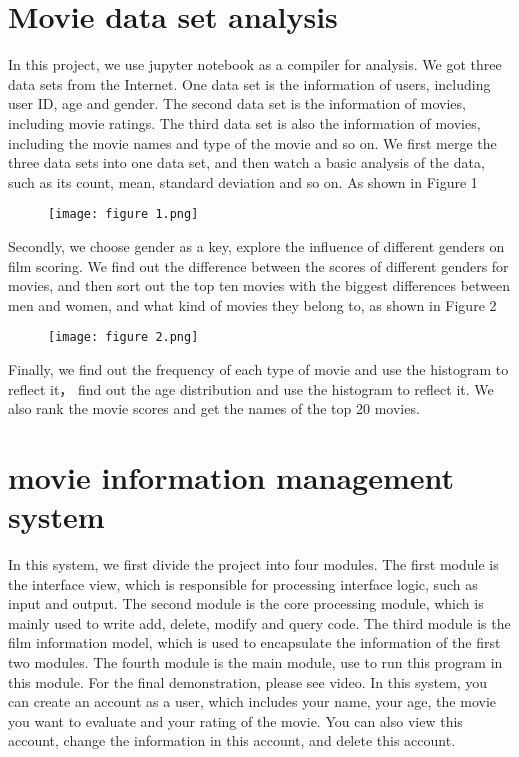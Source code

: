 \documentclass[conference]{IEEEtran}
\begin{document}
\section{Movie data set analysis}
In this project, we use jupyter notebook as a compiler for analysis. We got three data sets from the Internet. One data set is the information of users, including user ID, age and gender. The second data set is the information of movies, including movie ratings. The third data set is also the information of movies, including the movie names and type of the movie and so on. We first merge the three data sets into one data set, and then watch a basic analysis of the data, such as its count, mean, standard deviation and so on. As shown in Figure 1
\begin{figure}[H] %
\centering %
\texttt{[image: figure 1.png]} %
\caption{} %
\end{figure}
Secondly, we choose gender as a key, explore the influence of different genders on film scoring. We find out the difference between the scores of different genders for movies, and then sort out the top ten movies with the biggest differences between men and women, and what kind of movies they belong to, as shown in Figure 2
\begin{figure}[H] %
\centering %
\texttt{[image: figure 2.png]} %
\caption{} %
\end{figure}
Finally, we find out the frequency of each type of movie and use the histogram to reflect it， find out the age distribution and use the histogram to reflect it. We also rank the movie scores and get the names of the top 20 movies.
\section{movie information management system}
In this system, we first divide the project into four modules. The first module is the interface view, which is responsible for processing interface logic, such as input and output. The second module is the core processing module, which is mainly used to write add, delete, modify and query code. The third module is the film information model, which is used to encapsulate the information of the first two modules. The fourth module is the main module, use to run this program in this module.
For the final demonstration, please see video. In this system, you can create an account as a user, which includes your name, your age, the movie you want to evaluate and your rating of the movie. You can also view this account, change the information in this account, and delete this account.
\end{document}

